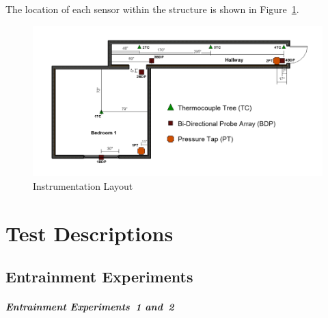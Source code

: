 \documentclass[12pt,oneside]{book}
\begin{document}
The location of each sensor within the structure is shown in Figure~\ref{fig:InstrumentDim}.

\begin{figure}[H]
	\centering
	\includegraphics[width=\textwidth]{Figures/Instrumentation/Instrument_Dimensions.png}
	\caption{Instrumentation Layout}
	\label{fig:InstrumentDim}
\end{figure}

\clearpage

\chapter{Test Descriptions}

\section*{Entrainment Experiments}

\paragraph{Entrainment Experiments~1 and~2} \mbox{}

\end{document}
